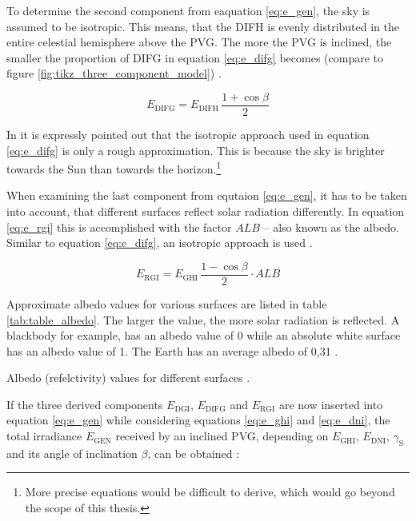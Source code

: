 To determine the second component from eaquation \ref{eq:e_gen}, the sky is assumed to be isotropic. This means, that the DIFH is evenly distributed in the entire celestial hemisphere above the PVG. The more the PVG is inclined, the smaller the proportion of DIFG in equation \ref{eq:e_difg} becomes (compare to figure \ref{fig:tikz_three_component_model}) \cite{Appelbaum:1993, Mertens:2015}. 
\begin{center}
	\begin{equation} \label{eq:e_difg}
		E_{\mathrm{DIFG}} = E_{\mathrm{DIFH}} \, \frac{1 + \cos \beta }{2}
	\end{equation}
\end{center} 
In \cite{Mertens:2015} it is expressly pointed out that the isotropic approach used in equation \ref{eq:e_difg} is only a rough approximation. This is because the sky is brighter towards the Sun than towards the horizon.\footnote{More precise equations would be difficult to derive, which would go beyond the scope of this thesis.} 

When examining the last component from equtaion \ref{eq:e_gen}, it has to be taken into account, that different surfaces reflect solar radiation differently. In equation \ref{eq:e_rgi} this is accomplished with the factor $ALB$ -- also known as the albedo. Similar to equation \ref{eq:e_difg}, an isotropic approach is used \cite{Appelbaum:1993, Dobos:2003, Mertens:2015, Bralower:2018}. 
\begin{center}
	\begin{equation} \label{eq:e_rgi}
		E_{\mathrm{RGI}} = E_{\mathrm{GHI}} \, \frac{1 - \cos \beta }{2} \cdot ALB
	\end{equation}
\end{center}
Approximate albedo values for various surfaces are listed in table \ref{tab:table_albedo}. The larger the value, the more solar radiation is reflected. A blackbody for example, has an albedo value of 0 while an absolute white surface has an albedo value of 1. The Earth has an average albedo of 0,31 \cite{Dobos:2003, Bennett:2010, Bralower:2018}.

\begin{table}[h!]
	\centering
	
	\caption{Albedo (refelctivity) values for different surfaces \cite{Dobos:2003, Bertol:2011, Mertens:2015, Bralower:2018}.}
	\label{tab:table_albedo}
\end{table}

If the three derived components $E_{\mathrm{DGI}}$, $E_{\mathrm{DIFG}}$ and $E_{\mathrm{RGI}}$ are now inserted into equation \ref{eq:e_gen} while considering equations \ref{eq:e_ghi} and \ref{eq:e_dni}, the total irradiance $E_{\mathrm{GEN}}$ received by an inclined PVG, depending on $E_{\mathrm{GHI}}$, $E_{\mathrm{DNI}}$, $\gamma_{\mathrm{S}}$ and its angle of inclination $\beta$, can be obtained \cite{Appelbaum:1992, Appelbaum:1993, Mertens:2015}:

